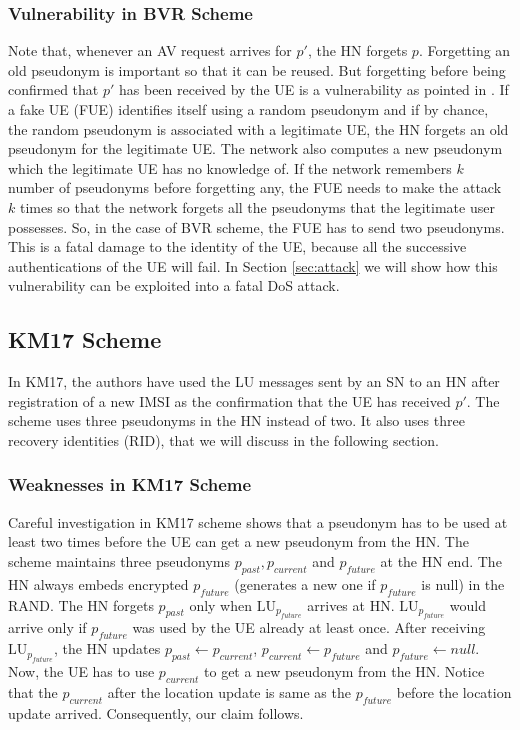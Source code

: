 \documentclass{llncs} %
\begin{document}
\subsubsection{Vulnerability in BVR Scheme}
Note that, whenever an AV request arrives for $p'$, the HN forgets $p$. Forgetting an old pseudonym is important so that it can be reused. But forgetting before being confirmed that $p'$ has been received by the UE is a vulnerability as pointed in \cite{wisec17}. If a fake UE (FUE) identifies itself using a random pseudonym and if by chance, the random pseudonym is associated with a legitimate UE, the HN forgets an old pseudonym for the legitimate UE. The network also computes a new pseudonym which the legitimate UE has no knowledge of. If the network remembers  $k$ number of pseudonyms before forgetting any, the FUE needs to make the attack $k$ times so that the network forgets all the pseudonyms that the legitimate user possesses. So, in the case of BVR scheme, the FUE has to send two pseudonyms. This is a fatal damage to the identity of the UE, because all the successive authentications of the UE will fail. In Section \ref{sec:attack} we will show how this vulnerability can be exploited into a fatal DoS attack.


\subsection{KM17 Scheme} \label{sec:km17scheme}
In KM17, the authors have used the LU messages sent by an SN to an HN after registration of a new IMSI as the confirmation that the UE has received $p'$. The scheme uses three pseudonyms in the HN instead of two. It also uses three recovery identities (RID), that we will discuss in the following section.


\subsubsection{Weaknesses in KM17 Scheme}
Careful investigation in KM17 scheme shows that a pseudonym has to be used at least two times before the UE can get a new pseudonym from the HN. The scheme maintains three pseudonyms $p_{past},p_{current}$ and $p_{future}$ at the HN end. The HN always embeds encrypted $p_{future}$ (generates a new one if $p_{future}$ is null) in the RAND. The HN forgets $p_{past}$ only when $\text{LU}_{p_{future}}$ arrives at HN. $\text{LU}_{p_{future}}$ would arrive only if $p_{future}$ was used by the UE already at least once. After receiving $\text{LU}_{p_{future}}$, the HN updates $p_{past} \leftarrow p_{current}$, $p_{current} \leftarrow p_{future}$ and $p_{future} \leftarrow null$. Now, the UE has to use $p_{current}$ to get a new pseudonym from the HN. Notice that the $p_{current}$ after the location update is same as the $p_{future}$ before the location update arrived. Consequently, our claim follows.
\end{document}
